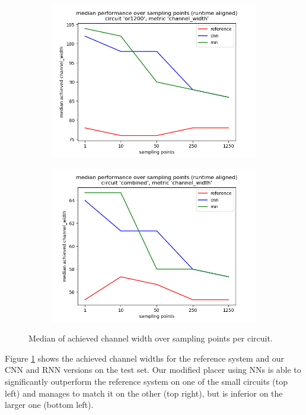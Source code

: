 \begin{figure}
\begin{subfigure}[b]{0.49\linewidth}
	\end{subfigure}
	\begin{subfigure}[b]{0.49\linewidth}
		\includegraphics[width=\linewidth]{plots/eval-or1200-chan-width-median-full.png}
	\end{subfigure}
	\begin{subfigure}[b]{0.49\linewidth}
		\includegraphics[width=\linewidth]{plots/eval-combined-chan-width-median-full.png}
	\end{subfigure}
	\caption{Median of achieved channel width over sampling points per circuit.}
	\label{fig:eval-chan-width-median}
\end{figure}

Figure \ref{fig:eval-chan-width-median} shows the achieved channel widths for the reference system and our \gls{CNN} and \gls{RNN} versions on the test set. Our modified placer using \glspl{NN} is able to significantly outperform the reference system on one of the small circuits (top left) and manages to match it on the other (top right), but is inferior on the larger one (bottom left). 

